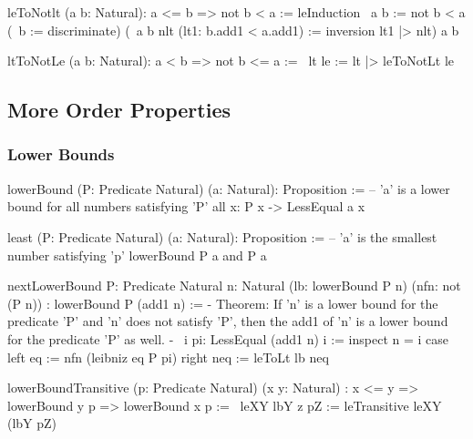 \begin{alba}
    leToNotlt (a b: Natural): a <= b => not b < a :=
        leInduction
            {\ a b := not b < a}
            (\ b := discriminate)
            (\ a b nlt (lt1: b.add1 < a.add1) :=
                inversion lt1 |> nlt)
            a
            b

    ltToNotLe (a b: Natural): a < b => not b <= a :=
        \ lt le :=
            lt |> leToNotLt le
\end{alba}










\vskip 5mm
\subsection{More Order Properties}

\subsubsection{Lower Bounds}

\begin{alba}
    lowerBound (P: Predicate Natural) (a: Natural): Proposition :=
            -- 'a' is a lower bound for all numbers satisfying 'P'
        all x: P x -> LessEqual a x

    least (P: Predicate Natural) (a: Natural): Proposition :=
            -- 'a' is the smallest number satisfying 'p'
        lowerBound P a and P a


    nextLowerBound
        {P: Predicate Natural}
        {n: Natural}
        (lb: lowerBound P n)
        (nfn: not (P n))
        : lowerBound P (add1 n)
    :=
        {- Theorem: If 'n' is a lower bound for the predicate 'P' and 'n'
           does not satisfy 'P', then the add1 of 'n' is a lower bound
           for the predicate 'P' as well. -}
        \ i pi: LessEqual (add1 n) i :=
            inspect n = i case
                left eq :=
                    nfn (leibniz eq P pi)
                right neq :=
                    leToLt lb neq

    lowerBoundTransitive
        (p: Predicate Natural)
        (x y: Natural)
        : x <= y => lowerBound y p => lowerBound x p
    :=
        \ leXY lbY z pZ :=
            leTransitive leXY (lbY pZ)
\end{alba}






